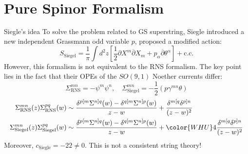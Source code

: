 \documentclass{beamer}
\begin{document}
\section[PS superstring]{Pure Spinor Formalism}
\begin{frame}{Siegle's idea}
	To solve the problem related to GS superstring, Siegle introduced a new independent Grassmann odd variable $p$, proposed a modified action: \cite{siegel1986classical}
	\begin{equation*}
		S_{\mathrm{Siegel}}=\frac{1}{\pi}\int d^2z\left[\frac{1}{2}\partial X^m\overline{\partial}X_m+p_\alpha\overline{\partial}\theta^\alpha\right]+\text{c.c.}
	\end{equation*}
	However, this formalism is {\color{WHU}not} equivalent to the RNS formalism. The key point lies in the fact that their OPEs of the $SO(9,1)$ Noether currents differ:
	\begin{equation*}
		\Sigma_{\mathrm{RNS}}^{mn}=-\psi^m\psi^n,\quad\Sigma_{\mathrm{Siegel}}^{mn}=-\frac{1}{2}(p\gamma^{mn}\theta)
	\end{equation*}
	\begin{equation}\label{ope diff}
		\begin{aligned}
			\Sigma_{\mathrm{RNS}}^{mn}(z)\Sigma_{\mathrm{RNS}}^{pq}(w)&\sim\frac{\delta^{p[m}\Sigma^{n]q}(w)-\delta^{q[m}\Sigma^{n]p}(w)}{z-w}+\frac{\delta^{m[q}\delta^{p]n}}{(z-w)^2}\\
			\Sigma_{\mathrm{Siegel}}^{mn}(z)\Sigma_{\mathrm{Siegel}}^{pq}(w)&\sim\frac{\delta^{p[m}\Sigma^{n]q}(w)-\delta^{q[m}\Sigma^{n]p}(w)}{z-w}+{\color{WHU}4}\frac{\delta^{m[q}\delta^{p]n}}{(z-w)^2}
		\end{aligned}
	\end{equation}
	 Moreover, $c_{\text{Siegle}}=-22\neq 0$. This is {\color{WHU}not} a consistent string theory!
\end{frame}
\end{document}
